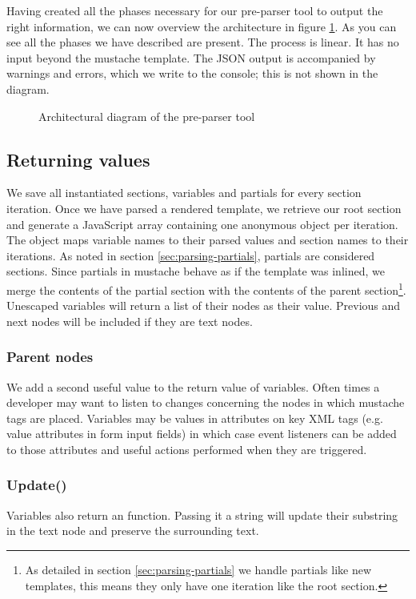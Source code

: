 \documentclass[thesis.tex]{subfiles}
\begin{document}
Having created all the phases necessary for our pre-parser tool to output the
right information, we can now overview the architecture in figure
\ref{fig:tool-arch}.
As you can see all the phases we have described are present. The process is
linear. It has no input beyond the mustache template. The JSON output is
accompanied by warnings and errors, which we write to the console; this is not
shown in the diagram.

\begin{figure}
	\centering
	\resizebox{\linewidth}{!}{}
	\caption{Architectural diagram of the pre-parser tool}
	\label{fig:tool-arch}
\end{figure}

\subsection{Returning values}
We save all instantiated sections, variables and partials for every section
iteration. Once we have parsed a rendered template, we retrieve our root section
and generate a JavaScript array containing one anonymous object per iteration.
The object maps variable names to their parsed values and section names to their
iterations.
As noted in section \ref{sec:parsing-partials}, partials are considered
sections. Since partials in mustache behave as if the template was inlined,
we merge the contents of the partial section with the contents of the
parent section\footnote{As detailed in section \ref{sec:parsing-partials} we
	handle partials like new templates, this means they only have one iteration
	like the root section.}.
Unescaped variables will return a list of their nodes as their value.
Previous and next nodes will be included if they are text nodes.

\subsubsection{Parent nodes}
\label{sec:parent-nodes}
We add a second useful value to the return value of variables. Often times a
developer may want to listen to changes concerning the nodes in which mustache
tags are placed. Variables may be values in attributes on key XML tags
(e.g. value attributes in form input fields) in which case event listeners can
be added to those attributes and useful actions performed when they are
triggered.

\subsubsection{Update()}
\label{sec:update}
Variables also return an  function. Passing it a string
will update their substring in the text node and preserve the surrounding text.
\end{document}
